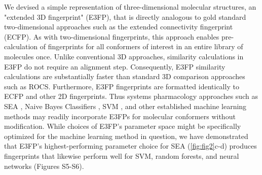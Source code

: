 \documentclass[../../main.tex]{subfiles}
\begin{document}
\begin{refsection}
	We devised a simple representation of three-dimensional molecular structures, an "extended 3D fingerprint" (E3FP), that is directly analogous to gold standard two-dimensional approaches such as the extended connectivity fingerprint (ECFP).
	As with two-dimensional fingerprints, this approach enables pre-calculation of fingerprints for all conformers of interest in an entire library of molecules once.
	Unlike conventional 3D approaches, similarity calculations in E3FP do not require an alignment step.
	Consequently, E3FP similarity calculations are substantially faster than standard 3D comparison approaches such as ROCS.
	Furthermore, E3FP fingerprints are formatted identically to ECFP and other 2D fingerprints.
	Thus systems pharmacology approaches such as SEA \supercite{keiser_2007,keiser_2009}, Naive Bayes Classifiers  \supercite{zhang_2004}, SVM \supercite{cortes_1995}, and other established machine learning methods may readily incorporate E3FPs for molecular conformers without modification.
	While choices of E3FP's parameter space might be specifically optimized for the machine learning method in question, we have demonstrated that E3FP's highest-performing parameter choice for SEA (\cref{fig:fig2}c-d) produces fingerprints that likewise perform well for SVM, random forests, and neural networks (Figures S5-S6).


\end{refsection}
\end{document}
